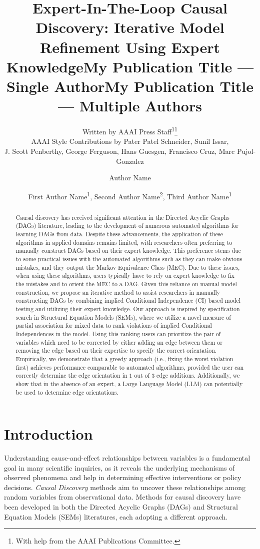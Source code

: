 \documentclass[letterpaper]{article} %
\title{Expert-In-The-Loop Causal Discovery: Iterative Model Refinement Using Expert Knowledge}
\author{
    Written by AAAI Press Staff\textsuperscript{\rm 1}\thanks{With help from the AAAI Publications Committee.}\\
    AAAI Style Contributions by Pater Patel Schneider,
    Sunil Issar,\\
    J. Scott Penberthy,
    George Ferguson,
    Hans Guesgen,
    Francisco Cruz\equalcontrib,
    Marc Pujol-Gonzalez\equalcontrib
}
\title{My Publication Title --- Single Author}
\author {
    Author Name
}
\title{My Publication Title --- Multiple Authors}
\author {
    First Author Name\textsuperscript{\rm 1},
    Second Author Name\textsuperscript{\rm 2},
    Third Author Name\textsuperscript{\rm 1}
}
\begin{document}
\maketitle

\begin{abstract}
Causal discovery has received significant attention in the Directed Acyclic
Graphs (DAGs) literature, leading to the development of numerous automated
algorithms for learning DAGs from data. Despite these advancements, the
application of these algorithms in applied domains remains limited, with
researchers often preferring to manually construct DAGs based on their expert
knowledge. This preference stems due to some practical issues with the
automated algorithms such as they can make obvious mistakes, and they output
the Markov Equivalence Class (MEC). Due to these issues, when using these
algorithms, users typically have to rely on expert knowledge to fix the
mistakes and to orient the MEC to a DAG. Given this reliance on manual model
construction, we propose an iterative method to assist researchers in manually
constructing DAGs by combining implied Conditional Independence (CI) based
model testing and utilizing their expert knowledge. Our approach is inspired by
specification search in Structural Equation Models (SEMs), where we utilize a
novel measure of partial association for mixed data to rank violations of
implied Conditional Independences in the model. Using this ranking users can
prioritize the pair of variables which need to be corrected by either adding an
edge between them or removing the edge based on their expertise to specify the
correct orientation. Empirically, we demonstrate that a greedy approach (i.e.,
fixing the worst violation first) achieves performance comparable to automated
algorithms, provided the user can correctly determine the edge orientation in $
1 $ out of $ 3 $ edge additions. Additionally, we show that in the absence of
an expert, a Large Language Model (LLM) can potentially be used to determine
edge orientations. 
\end{abstract}

\section{Introduction}

Understanding cause-and-effect relationships between variables is a fundamental
goal in many scientific inquiries, as it reveals the underlying mechanisms of
observed phenomena and help in determining effective interventions or policy
decisions. \emph{Causal Discovery} methods aim to uncover these relationships
among random variables from observational data. Methods for causal discovery
have been developed in both the Directed Acyclic Graphs (DAGs) and Structural
Equation Models (SEMs) literatures, each adopting a different approach. 
\end{document}
